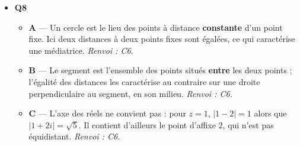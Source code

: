 \begin{itemize}
\begin{itemize}
    \item \textbf{B} — En développant, $(z-1)(z^2+2z+2)=z^3+z^2-2$, qui ne coïncide avec $P$ ni en $z^2$ ni en $z$. Les signes du quotient ont été inversés. \emph{Renvoi : C4.}
    \item \textbf{D} — $(z-1)^3=z^3-3z^2+3z-1$ : ni le terme en $z$ ni le terme constant ne conviennent. Les deux autres racines de $P$ sont $1+i$ et $1-i$, non réelles, donc distinctes de $1$. \emph{Renvoi : C4.}
  \end{itemize}
  \item \textbf{Q8}
  \begin{itemize}
    \item \textbf{A} — Un cercle est le lieu des points à distance \textbf{constante} d'un point fixe. Ici deux distances à deux points fixes sont égalées, ce qui caractérise une médiatrice. \emph{Renvoi : C6.}
    \item \textbf{B} — Le segment est l'ensemble des points situés \textbf{entre} les deux points ; l'égalité des distances les caractérise au contraire sur une droite perpendiculaire au segment, en son milieu. \emph{Renvoi : C6.}
    \item \textbf{C} — L'axe des réels ne convient pas : pour $z=1$, $|1-2|=1$ alors que $|1+2i|=\sqrt5$. Il contient d'ailleurs le point d'affixe $2$, qui n'est pas équidistant. \emph{Renvoi : C6.}
  \end{itemize}
\end{itemize}
\fi
